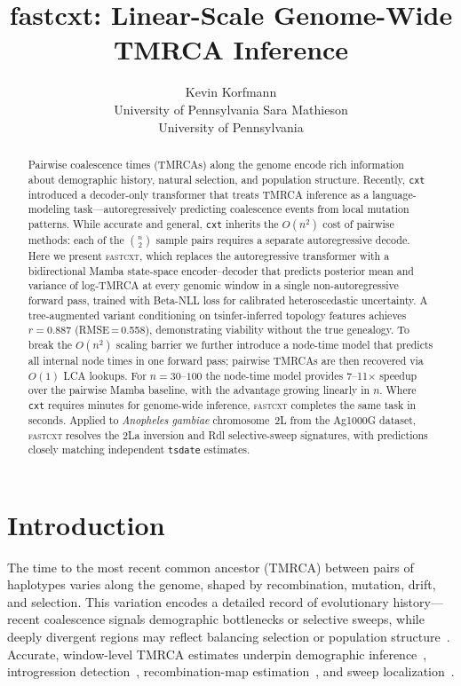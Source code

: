 \documentclass{article}
\title{fastcxt: Linear-Scale Genome-Wide TMRCA Inference}
\author{
  Kevin Korfmann \\
  University of Pennsylvania
  \And
  Sara Mathieson \\
  University of Pennsylvania
}
\begin{document}
\maketitle

\begin{abstract}
Pairwise coalescence times (TMRCAs) along the genome encode rich information about
demographic history, natural selection, and population structure. Recently,
\texttt{cxt}~\citep{korfmann2025cxt} introduced a decoder-only transformer that treats TMRCA
inference as a language-modeling task---autoregressively predicting coalescence events from
local mutation patterns. While accurate and general, \texttt{cxt} inherits the $O(n^2)$
cost of pairwise methods: each of the $\binom{n}{2}$ sample pairs requires a separate
autoregressive decode. Here we present \textsc{fastcxt}, which replaces the autoregressive
transformer with a bidirectional Mamba state-space encoder--decoder that predicts posterior
mean and variance of log-TMRCA at every genomic window in a single non-autoregressive
forward pass, trained with Beta-NLL loss for calibrated heteroscedastic uncertainty.
A tree-augmented variant conditioning on tsinfer-inferred topology features achieves
$r = 0.887$ (RMSE\,=\,0.558), demonstrating viability without the true genealogy.
To break the $O(n^2)$ scaling barrier we further introduce a node-time model that predicts
all internal node times in one forward pass; pairwise TMRCAs are then recovered via $O(1)$
LCA lookups. For $n = 30$--$100$ the node-time model provides 7--11$\times$ speedup over
the pairwise Mamba baseline, with the advantage growing linearly in $n$. Where
\texttt{cxt} requires minutes for genome-wide inference, \textsc{fastcxt} completes the
same task in seconds. Applied to \emph{Anopheles gambiae} chromosome~2L from the Ag1000G
dataset, \textsc{fastcxt} resolves the 2La inversion and Rdl selective-sweep signatures,
with predictions closely matching independent \texttt{tsdate} estimates.
\end{abstract}

\section{Introduction}

The time to the most recent common ancestor (TMRCA) between pairs of haplotypes varies along
the genome, shaped by recombination, mutation, drift, and selection. This variation encodes a
detailed record of evolutionary history---recent coalescence signals demographic bottlenecks or
selective sweeps, while deeply divergent regions may reflect balancing selection or population
structure~\citep{schiffels2014inferring}. Accurate, window-level TMRCA estimates underpin
demographic inference~\citep{li2011inference}, introgression
detection~\citep{racimo2017signatures}, recombination-map
estimation~\citep{spence2019inference}, and sweep
localization~\citep{stern2019approximate}.
\end{document}
